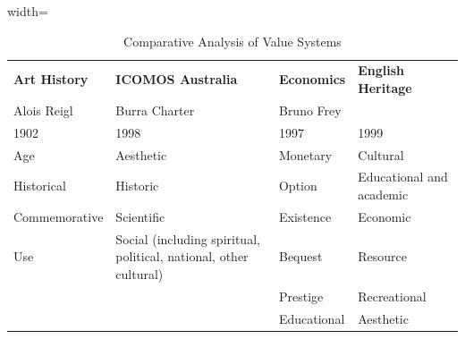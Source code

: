 \begin{table}[h]
    \centering
    \caption{Comparative Analysis of Value Systems}
    \label{tab:values_comparison}
\end{table}

\begin{table}[h]
    \centering
    \begin{adjustbox}{width=\textwidth}
        \begin{tabular}{llll}
            \toprule
            \textbf{Art History} & \textbf{ICOMOS Australia} &
            \textbf{Economics} & \textbf{English Heritage} \\
            Alois Reigl & Burra Charter & Bruno Frey &  \\ 
            1902 & 1998 & 1997 & 1999 \\ \hline
            Age& Aesthetic& Monetary & Cultural\\ 
             Historical &  Historic&  Option &  Educational and academic \\ 
             Commemorative& Scientific& Existence & Economic\\ 
             Use&  Social (including spiritual, political, national, other
    cultural)&  Bequest &  Resource \\ 
             & & Prestige & Recreational \\
             & & Educational & Aesthetic\\
        \end{tabular}
    \end{adjustbox}
    \caption{Comparative Analysis of Value Systems}
    \label{tab:values_comparison}
\end{table}



